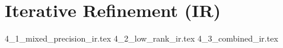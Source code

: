 \chapter{Iterative Refinement (IR)}
\label{chap:iterative_refinement}

{4_1_mixed_precision_ir.tex}
{4_2_low_rank_ir.tex}
{4_3_combined_ir.tex}